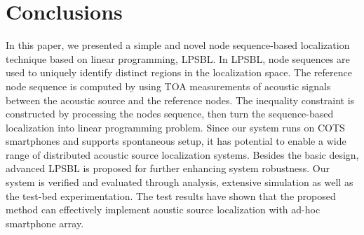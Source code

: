 
\section{Conclusions}

In this paper, we presented a simple and novel node sequence-based localization technique based on linear programming, LPSBL. 
In LPSBL, node sequences are used to uniquely identify distinct regions in the localization space. 
The reference node sequence is computed by using TOA measurements of acoustic signals between the acoustic source and the reference nodes.
The inequality constraint is constructed by processing the nodes sequence, then turn the sequence-based localization into linear programming problem. 
Since our system runs on COTS smartphones and supports spontaneous setup, 
 it has potential to enable a wide range of distributed acoustic source localization systems. 
 Besides the basic design, advanced LPSBL is proposed for further enhancing system robustness.
 Our system is verified and evaluated through analysis, extensive simulation as well as the test-bed experimentation.
 The test results have shown that the proposed method can effectively implement aoustic source localization with ad-hoc smartphone array.


